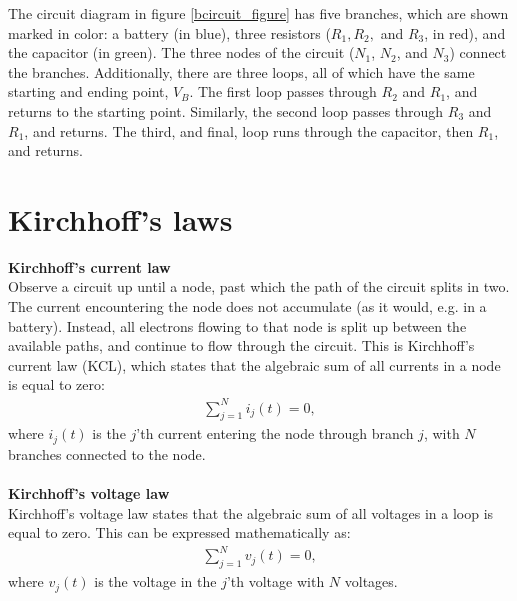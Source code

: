 \noindent The circuit diagram in figure \ref{bcircuit_figure} has five branches, which are shown marked in color: a battery (in blue), three resistors ($R_1, R_2,$ and $R_3$, in red), and the capacitor (in green). The three nodes of the circuit ($N_1$, $N_2$, and $N_3$) connect the branches. Additionally, there are three loops, all of which have the same starting and ending point, $V_{B}$. The first loop passes through $R_2$ and $R_1$, and returns to the starting point. Similarly, the second loop passes through $R_3$ and $R_1$, and returns. The third, and final, loop runs through the capacitor, then $R_1$, and returns. 

\section{Kirchhoff's laws}\label{Klaws}
\textbf{Kirchhoff's current law}
\\
Observe a circuit up until a node, past which the path of the circuit splits in two. The current encountering the node does not accumulate (as it would, e.g. in a battery). Instead, all electrons flowing to that node is split up between the available paths, and continue to flow through the circuit. This is Kirchhoff’s current law (KCL), which states that the algebraic sum of all currents in a node is equal to zero:
\begin{align*}
\sum_{j=1}^{N} i_{j}(t) = 0,
\end{align*}
where $i_{j}(t)$ is the $j$'th current entering the node through branch $j$, with $N$ branches connected to the node. \cite[p.~32]{bcircuit}
\\
\\
\textbf{Kirchhoff's voltage law}
\\
Kirchhoff's voltage law states that the algebraic sum of all voltages in a loop is equal to zero. This can be expressed mathematically as:
\begin{align*}
\sum_{j=1}^{N} v_{j}(t) = 0,
\end{align*}
where $v_{j}(t)$ is the voltage in the $j$'th voltage with $N$ voltages. \citep[p.~34]{bcircuit}\\

